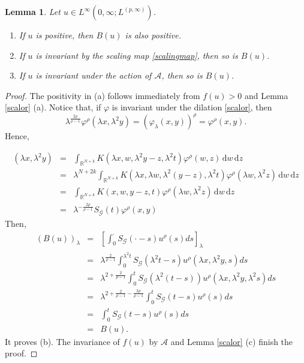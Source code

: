 \documentclass[12pt]{amsart}
\newtheorem{lemma}[theorem]{Lemma}
\newcommand{\di}{\, \mathrm{d}}
\begin{document}
\begin{lemma}\label{scalb}
	Let $u \in L^\infty(0,\infty; L^{(p, \infty)})$.
	\begin{enumerate}
		\item[(a)] If $u$ is positive, then $B(u)$ is also positive.
		\item[(b)] If $u$ is invariant by the scaling map \eqref{scalingmap}, then so is $B(u)$.
		\item[(c)] If $u$ is invariant under the action of $\mathcal{A}$, then so is $B(u)$.
	\end{enumerate} 
\end{lemma}

\begin{proof}
	The positivity in (a) follows immediately from $f(u)>0$ and Lemma \ref{scalor} (a).
	Notice that, if $\varphi$ is invariant under the dilation \eqref{scalor}, then
	\begin{equation}\label{homop}
		\lambda^{\frac{2\rho}{\rho-1}} \varphi^{\rho}(\lambda x,\lambda^2y) = (\varphi_{\lambda}(x,y))^\rho = \varphi^\rho(x,y) .
	\end{equation}
	Hence,
	
	\begin{eqnarray*}
		[S_\mathcal{G}(\lambda^2t)\varphi^{\rho}](\lambda x, \lambda^2y) & = &   \int_{\mathbb{R}^{N+k}} K(\lambda x,w,\lambda^2y-z,\lambda^2t) \varphi^{\rho}(w,z) \di w \di z\\
		&=& \lambda^{ N +2k } \int_{\mathbb{R}^{N+k}} K(\lambda x, \lambda w,\lambda^2 (y-z),\lambda^2t) \varphi^{\rho}(\lambda w, \lambda^2 z) \di w \di z\\
		&=&  \int_{\mathbb{R}^{N+k}} K( x,  w, y-z,t) \varphi^{\rho}(\lambda w, \lambda^2 z) \di w \di z\\
		&=& \lambda^{ - \frac{2\rho}{\rho-1}} S_\mathcal{G}(t)\varphi^{\rho}(x,y)
	\end{eqnarray*}
	Then,
	\begin{eqnarray*}
		(B(u))_\lambda &=& \left[ \int^{\cdot}_0S_\mathcal{G}(\cdot-s)u^{\rho}(s)ds\right]_{\lambda} \\
		&=& \lambda^{\frac{2}{\rho-1}}\int^{\lambda^2t}_0S_\mathcal{G}(\lambda^2t-s)u^{\rho}(\lambda x, \lambda^2y, s) ds\\
		&=&\lambda^{2+\frac{2}{\rho-1}} \int^t_0 S_\mathcal{G}(\lambda^2(t-s)) u^{\rho}(\lambda x,\lambda^2y, \lambda^2s)ds\\
		&=&\lambda^{2+\frac{2}{\rho-1}- \frac{2\rho}{\rho-1}} \int^t_0S_\mathcal{G}(t-s)u^{\rho}(s)ds\\
		&=&\int^t_0S_\mathcal{G}(t-s)u^{\rho}(s)ds \\
		&=& B(u).
	\end{eqnarray*}
	It proves (b). The invariance of $f(u)$ by $\mathcal{A}$ and Lemma \ref{scalor} (c) finish the proof.
\end{proof}
\end{document}
